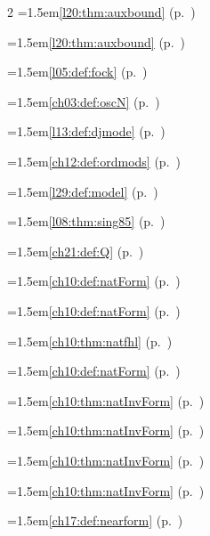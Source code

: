 \begin{multicols}{2}
\hangindent=1.5em\quad \ref{l20:thm:auxbound} (p.~\pageref{l20:thm:auxbound})\par
\hangindent=1.5em\quad \ref{l20:thm:auxbound} (p.~\pageref{l20:thm:auxbound})\par
\hangindent=1.5em\quad \ref{l05:def:fock} (p.~\pageref{l05:def:fock})\par
\hangindent=1.5em\quad \ref{ch03:def:oscN} (p.~\pageref{ch03:def:oscN})\par
\hangindent=1.5em\quad \ref{l13:def:djmode} (p.~\pageref{l13:def:djmode})\par
\hangindent=1.5em\quad \ref{ch12:def:ordmods} (p.~\pageref{ch12:def:ordmods})\par
\hangindent=1.5em\quad \ref{l29:def:model} (p.~\pageref{l29:def:model})\par
\par{}\par\nopagebreak\smallskip
\hangindent=1.5em\quad \ref{l08:thm:sing85} (p.~\pageref{l08:thm:sing85})\par
\hangindent=1.5em\quad \ref{ch21:def:Q} (p.~\pageref{ch21:def:Q})\par
\hangindent=1.5em\quad \ref{ch10:def:natForm} (p.~\pageref{ch10:def:natForm})\par
\hangindent=1.5em\quad \ref{ch10:def:natForm} (p.~\pageref{ch10:def:natForm})\par
\hangindent=1.5em\quad \ref{ch10:thm:natfhl} (p.~\pageref{ch10:thm:natfhl})\par
\hangindent=1.5em\quad \ref{ch10:def:natForm} (p.~\pageref{ch10:def:natForm})\par
\hangindent=1.5em\quad \ref{ch10:thm:natInvForm} (p.~\pageref{ch10:thm:natInvForm})\par
\hangindent=1.5em\quad \ref{ch10:thm:natInvForm} (p.~\pageref{ch10:thm:natInvForm})\par
\hangindent=1.5em\quad \ref{ch10:thm:natInvForm} (p.~\pageref{ch10:thm:natInvForm})\par
\hangindent=1.5em\quad \ref{ch10:thm:natInvForm} (p.~\pageref{ch10:thm:natInvForm})\par
\hangindent=1.5em\quad \ref{ch17:def:nearform} (p.~\pageref{ch17:def:nearform})\par

\end{multicols}
